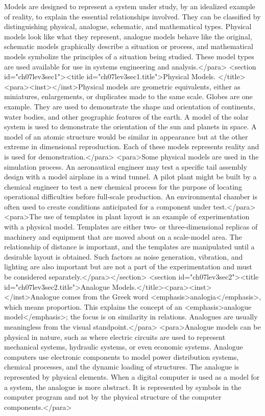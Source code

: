 Models are designed to represent a system under study, by an idealized example of reality, to explain the essential relationships involved. They can be classified by distinguishing physical, analogue, schematic, and mathematical types. Physical models look like what they represent, analogue models behave like the original, schematic models graphically describe a situation or process, and mathematical models symbolize the principles of a situation being studied. These model types are used available for use in systems engineering and analysis.</para>
<section id="ch07lev3sec1"><title id="ch07lev3sec1.title">Physical Models. </title><para><inst></inst>Physical models are geometric equivalents, either as miniatures, enlargements, or duplicates made to the same scale. Globes are one example. They are used to demonstrate the shape and orientation of continents, water bodies, and other geographic features of the earth. A model of the solar system is used to demonstrate the orientation of the sun and planets in space. A model of an atomic structure would be similar in appearance but at the other extreme in dimensional reproduction. Each of these models represents reality and is used for demonstration.</para>
<para>Some physical models are used in the simulation process. An aeronautical engineer may test a specific tail assembly design with a model airplane in a wind tunnel. A pilot plant might be built by a chemical engineer to test a new chemical process for the purpose of locating operational difficulties before full-scale production. An environmental chamber is often used to create conditions anticipated for a component under test.</para>
<para>The use of templates in plant layout is an example of experimentation with a physical model. Templates are either two- or three-dimensional replicas of machinery and equipment that are moved about on a scale-model area. The relationship of distance is important, and the templates are manipulated until a desirable layout is obtained. Such factors as noise generation, vibration, and lighting are also important but are not a part of the experimentation and must be considered separately.</para></section>
<section id="ch07lev3sec2"><title id="ch07lev3sec2.title">Analogue Models.</title><para><inst></inst>Analogue comes from the Greek word <emphasis>analogia</emphasis>, which means proportion. This explains the concept of an <emphasis>analogue model</emphasis>; the focus is on similarity in relations. Analogues are usually meaningless from the visual standpoint.</para>
<para>Analogue models can be physical in nature, such as where electric circuits are used to represent mechanical systems, hydraulic systems, or even economic systems. Analogue computers use electronic components to model power distribution systems, chemical processes, and the dynamic loading of structures. The analogue is represented by physical elements. When a digital computer is used as a model for a system, the analogue is more abstract. It is represented by symbols in the computer program and not by the physical structure of the computer components.</para>
